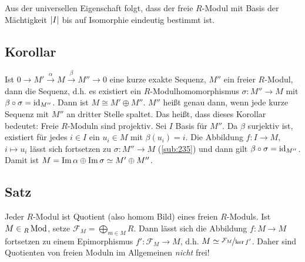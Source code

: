 Aus der universellen Eigenschaft folgt, dass der freie $R$-Modul mit Basis der Mächtigkeit $\lvert I\rvert$ bis auf Isomorphie eindeutig bestimmt ist.

\subsection[Korollar: Über das Spalten einer kurzen Sequenz von $R$-Moduln]{Korollar} %
\label{sub:236}
Ist $0 \to M' \xrightarrow{\alpha} M \xrightarrow{\beta} M'' \to 0  $ eine kurze exakte Sequenz, $M''$ ein freier $R$-Modul, dann  die Sequenz, d.h. es 
existiert ein $R$-Modulhomomorphismus $\sigma : M''  \to M$ mit $\beta \circ \sigma = \operatorname{id}_{M''}$. Dann ist $M \cong M' \oplus M''$.
$M''$ heißt  genau dann, wenn jede kurze Sequenz mit $M''$ an dritter Stelle spaltet. Das heißt, dass dieses Korollar bedeutet: Freie $R$-Moduln sind 
projektiv. 
Sei $I$ Basis für $M''$. Da $\beta$ surjektiv ist, existiert für jedes $i \in I$ ein $u_i \in M$ mit $\beta(u_i)= i$. Die Abbildung $f : I \to M$, $i \mapsto u_i$ lässt 
sich fortsetzen zu $\sigma : M'' \to M$ (\ref{sub:235}) und dann gilt $\beta \circ \sigma = \operatorname{id}_{M''}$. Damit ist $M = \operatorname{Im} \alpha \oplus \operatorname{Im} \sigma \simeq M' \oplus M''$.
\bewende

\subsection[Satz: Jeder $R$-Modul ist Quotient eines freien $R$-Moduls]{Satz} %
\label{sub:237}
Jeder $R$-Modul ist Quotient (also homom Bild) eines freien $R$-Moduls. 
Ist $M \in {_R \operatorname{Mod}}$, setze $\mathcal{F}_M = \bigoplus_{m \in M} R$. Dann lässt sich die Abbildung
$f : M \to M$ fortsetzen zu einem Epimorphismus $f' : \mathcal{F}_M \to M$, d.h. $M \simeq \nicefrac{\mathcal{F}_M}{\ker f'}$. Daher sind Quotienten von freien Moduln 
im Allgemeinen \emph{nicht} frei! \bewende

